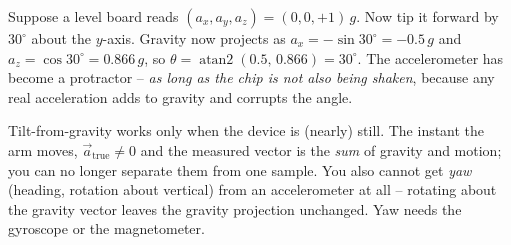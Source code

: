 \begin{example}
\label{ch34:ex-tilt}
Suppose a level board reads $(a_x,a_y,a_z)=(0,0,+1)\,g$. Now tip it forward by
$30^\circ$ about the $y$-axis. Gravity now projects as
$a_x = -\sin 30^\circ = -0.5\,g$ and $a_z = \cos 30^\circ = 0.866\,g$, so
$\theta = \operatorname{atan2}(0.5,\,0.866) = 30^\circ$. The accelerometer has become a
protractor -- \emph{as long as the chip is not also being shaken}, because any real
acceleration adds to gravity and corrupts the angle.
\end{example}

\begin{trapbox}
Tilt-from-gravity works only when the device is (nearly) still. The instant the arm
moves, $\vec a_{\text{true}}\ne 0$ and the measured vector is the \emph{sum} of gravity
and motion; you can no longer separate them from one sample. You also cannot get
\emph{yaw} (heading, rotation about vertical) from an accelerometer at all -- rotating
about the gravity vector leaves the gravity projection unchanged. Yaw needs the
gyroscope or the magnetometer.
\end{trapbox}


